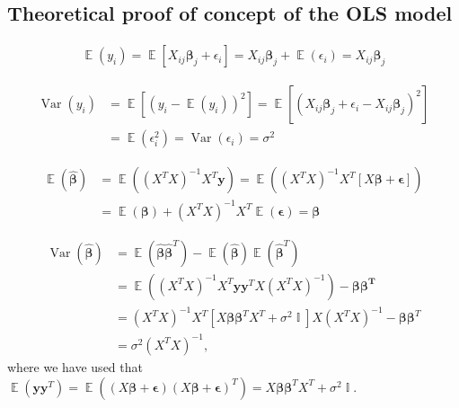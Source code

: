 \documentclass[twocolumn,english,notitlepage]{article}
\renewcommand{\vec}[1]{\boldsymbol{#1}}
\newcommand{\pclosed}[1]{\left(#1\right)}
\newcommand{\bclosed}[1]{\left[#1\right]}
\renewcommand{\expval}{\operatorname{\mathbb{E}}}
\renewcommand{\var}{\operatorname{Var}}
\DeclareMathOperator{\eye}{\mathbb{I}}
\newcommand{\betahat}{\hat{\beta}}
\begin{document}
\begin{appendices}
    \section{Theoretical proof of concept of the OLS model}
        \begin{align}
            \expval(y_i) = \expval\bclosed{X_{ij} \vec{\beta}_j + \epsilon_i} = X_{ij}\vec{\beta}_j + \expval(\epsilon_i) = X_{ij}\vec{\beta}_j
        \end{align}

        \begin{align} \nonumber
            \var(y_i) &= \expval\bclosed{\pclosed{y_i-\expval\pclosed{y_i}}^2} = \expval\bclosed{\pclosed{X_{ij}\vec{\beta}_j + \epsilon_i - X_{ij}\vec{\beta}_j}^2} \\
            &= \expval\pclosed{\epsilon_i^2} = \var\pclosed{\epsilon_i} = \sigma^2
        \end{align}

        \begin{align} \nonumber
            \expval(\vec{\betahat}) &= \expval\pclosed{(X^TX)^{-1}X^T \vec{y}} = \expval\pclosed{(X^TX)^{-1}X^T \bclosed{X\vec{\beta} + \vec{\epsilon}} } \\
            &= \expval\pclosed{\vec{\beta}} + {(X^TX)}^{-1}X^T \expval\pclosed{\vec{\epsilon}} = \vec{\beta}
        \end{align}

        \begin{align} \nonumber
            \var(\vec{\betahat}) &= \expval({\vec{\betahat} \vec{\betahat}^T}) - \expval({\vec{\betahat}}) \expval({\vec{\betahat}^T}) \\ \nonumber
            &= \expval((X^TX)^{-1}X^T \vec{y} \vec{y}^T X (X^TX)^{-1}) - \vec{\beta}\vec{\beta^T} \\ \nonumber
            &= (X^TX)^{-1}X^T \bclosed{X\vec{\beta}\vec{\beta}^TX^T + \sigma^2 \eye}X (X^TX)^{-1} - \vec{\beta}\vec{\beta}^T \\
            &= \sigma^2 (X^TX)^{-1},
        \end{align}
        where we have used that \(\expval(\vec{y}\vec{y}^T) = \expval\pclosed{(X\vec{\beta}+\vec{\epsilon})(X\vec{\beta}+\vec{\epsilon})^T} = X\vec{\beta}\vec{\beta}^TX^T + \sigma^2 \eye\).


\end{appendices}
\end{document}
